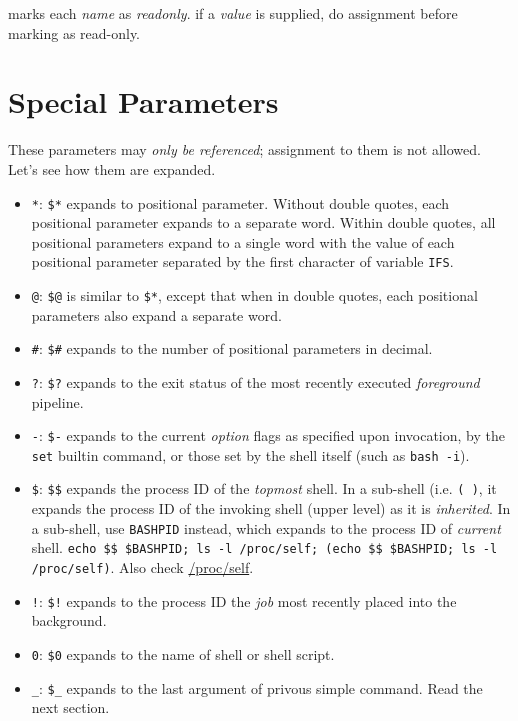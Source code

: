 marks each \textit{name} as \textit{readonly}. if a \textit{value}
is supplied, do assignment before marking as read-only.

\section{Special Parameters}
\label{sec:bash-special-parameters}

These parameters may \textit{only be referenced}; assignment to
them is not allowed. Let's see how them are expanded.

\begin{itemize}
\item \verb|*|: \lstinline|$*| expands to positional
  parameter. Without double quotes, each positional parameter
  expands to a separate word. Within double quotes, all positional
  parameters expand to a single word with the value of each
  positional parameter separated by the first character of
  variable \lstinline|IFS|.
\item \verb|@|: \lstinline|$@| is similar to \lstinline|$*|,
  except that when in double quotes, each positional parameters
  also expand a separate word.
\item \verb|#|: \lstinline|$#| expands to the number of positional
  parameters in decimal.
\item \verb|?|: \lstinline|$?| expands to the exit status of the
  most recently executed \textit{foreground} pipeline.
\item \verb|-|: \lstinline|$-| expands to the current
  \textit{option} flags as specified upon invocation, by the
  \lstinline|set| builtin command, or those set by the shell
  itself (such as \lstinline|bash -i|).
\item \verb|$|: \lstinline|$$| expands the process ID of the
  \textit{topmost} shell. In a sub-shell (i.e. \lstinline|( )|, it
  expands the process ID of the invoking shell (upper level) as it
  is \textit{inherited}. In a sub-shell, use \lstinline|BASHPID|
  instead, which expands to the process ID of \textit{current}
  shell.
  \lstinline|echo $$ $BASHPID; ls -l /proc/self; (echo $$ $BASHPID; ls -l /proc/self)|.
  Also check
  \href{https://unix.stackexchange.com/a/333227}{/proc/self}.
\item \verb|!|: \lstinline|$!| expands to the process ID the
  \textit{job} most recently placed into the background.
\item \verb|0|: \lstinline|$0| expands to the name of shell or
  shell script.
\item \verb|_|: \lstinline|$_| expands to the last argument of
  privous simple command. Read the next section.
\end{itemize}

